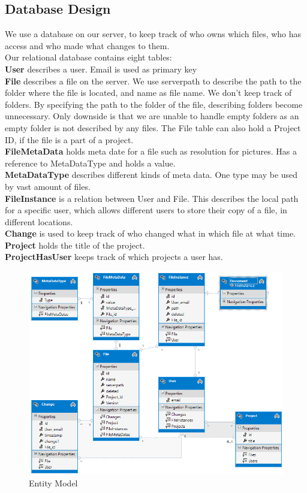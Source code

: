 \subsection{Database Design}
We use a database on our server, to keep track of who owns which files, who has access and who made what changes to them.\\
Our relational database contains eight tables:\\
\textbf{User} describes a user. Email is used as primary key\\
\textbf{File} describes a file on the server. We use serverpath to describe the path to the folder where the file is located, and name as file name. We don't keep track of folders. By specifying the path to the folder of the file, describing folders become unnecessary. Only downside is that we are unable to handle empty folders as an empty folder is not described by any files. The File table can also hold a Project ID, if the file is a part of a project.\\
\textbf{FileMetaData} holds meta date for a file such as resolution for pictures. Has a reference to MetaDataType and holds a value.\\
\textbf{MetaDataType} describes different kinds of meta data. One type may be used by vast amount of files.\\
\textbf{FileInstance} is a relation between User and File. This describes the local path for a specific user, which allows different users to store their copy of a file, in different locations.\\
\textbf{Change} is used to keep track of who changed what in which file at what time.\\
\textbf{Project} holds the title of the project.\\
\textbf{ProjectHasUser} keeps track of which projects a user has.\\
\begin{figure}[h]
  \includegraphics[width=\textwidth,natwidth=793,natheight=635]{illustrations/entitymodel.png}
  \caption{Entity Model}
  \label{entitymodel}
\end{figure}